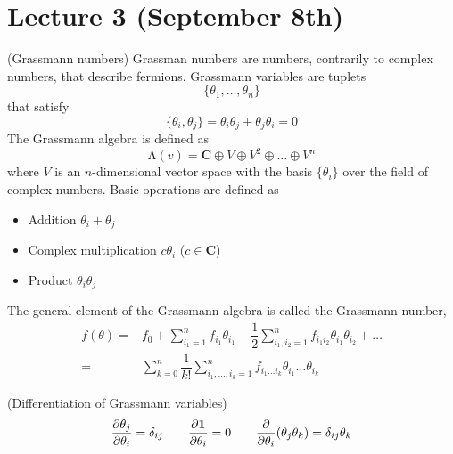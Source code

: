 \section{Lecture 3 (September 8th)}
\begin{defi}
(Grassmann numbers) Grassman numbers are numbers, contrarily to complex numbers, that describe fermions. Grassmann variables are tuplets 
\[\{\theta_1,\ldots ,\theta_{n}\}\]
that satisfy
\[\{\theta _{i},\theta _{j}\}=\theta _{i}\theta _{j}+\theta _{j}\theta _{i}=0\]
The Grassmann algebra is defined as
\[\mathrm{\Lambda }(v)={\bm C}\oplus V\oplus V^2\oplus \ldots \oplus V^{n}\]
where $V$ is an $n$-dimensional vector space with the basis $\{\theta _{i}\}$ over the field of complex numbers. Basic operations are defined as
\begin{itemize}
	\item[(i)] Addition $\theta _{i}+\theta _{j}$
	\item[(ii)] Complex multiplication $c\theta _{i}$ ($c\in {\bm C}$)
	\item[(iii)] Product $\theta_{i}\theta _{j}$
\end{itemize}
The general element of the Grassmann algebra is called the Grassmann number,
\[\begin{align*}
	f(\theta )=&f_{0}+\sum ^{n}_{i_{1}=1}f_{i_1}\theta _{i_1}+\dfrac{1}{2}\sum _{i_1,i_2=1}^{n}f_{i_1i_2}\theta _{i_1}\theta _{i_2}+\ldots \\
	=& \sum ^{n}_{k=0}\dfrac{1}{k!}\sum ^{n}_{i_1,\ldots ,i_{k}=1}f_{i_1\ldots i_{k}}\theta _{i_1}\ldots \theta _{i_{k}}
\end{align*}\]	
\end{defi}
\vspace{2ex}
\begin{defi}
(Differentiation of Grassmann variables) 
	\[\dfrac{\partial \theta _{j}}{\partial \theta _{i}}=\delta _{ij}\qquad \dfrac{\partial {\bf 1}}{\partial \theta _{i}}=0\qquad \dfrac{\partial }{\partial \theta _{i}}(\theta _{j}\theta _{k})=\delta _{ij}\theta _{k}   \]
\end{defi}
\vspace{2ex}
